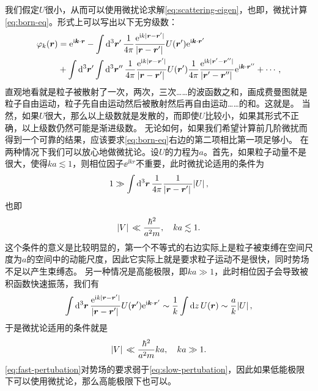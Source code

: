 我们假定$U$很小，从而可以使用微扰论求解\eqref{eq:scattering-eigen}，也即，微扰计算\eqref{eq:born-eq}。形式上可以写出以下无穷级数：
\[
    \begin{aligned}
        \varphi_k(\vb*{r}) &= \mathrm{e}^{\mathrm{i} \vb*{k} \cdot \vb*{r}} - \int \dd[3]{\vb*{r}'} \frac{1}{4\pi} \frac{\mathrm{e}^{\mathrm{i} k \abs*{\vb*{r} - \vb*{r}'}}}{\abs*{\vb*{r} - \vb*{r}'}} U(\vb*{r}') \mathrm{e}^{\mathrm{i} \vb*{k} \cdot \vb*{r}'} \\
        &+ \int \dd[3]{\vb*{r}'} \int \dd[3]{\vb*{r}''} \frac{1}{4\pi} \frac{\mathrm{e}^{\mathrm{i} k \abs*{\vb*{r} - \vb*{r}'}}}{\abs*{\vb*{r} - \vb*{r}'}} U(\vb*{r}') \frac{1}{4\pi} \frac{\mathrm{e}^{\mathrm{i} k \abs*{\vb*{r}' - \vb*{r}''}}}{\abs*{\vb*{r}' - \vb*{r}''}} \mathrm{e}^{\mathrm{i} \vb*{k} \cdot \vb*{r}''} + \cdots,
    \end{aligned}
\]
直观地看就是粒子被散射了一次，两次，三次……的波函数之和，画成费曼图就是粒子自由运动，粒子先自由运动然后被散射然后再自由运动……的和。这就是。
当然，如果$U$很大，那么以上级数就是发散的，而即使$U$比较小，如果其形式不正确，以上级数仍然可能是渐进级数。
无论如何，如果我们希望计算前几阶微扰而得到一个可靠的结果，应该要求\eqref{eq:born-eq}右边的第二项相比第一项足够小。
在两种情况下我们可以放心地做微扰论。设$U$的力程为$a$。首先，如果粒子动量不是很大，使得$k a \lesssim 1$，则相位因子$\ee^{\ii k r}$不重要，此时微扰论适用的条件为
\[
    1 \gg \int \dd[3]{\vb*{r}} \frac{1}{4\pi} \frac{1}{\abs*{\vb*{r} - \vb*{r}'}} \abs*{U},
\]
也即
\begin{equation}
    \abs*{V} \ll \frac{\hbar^2}{a^2 m} , \quad k a \lesssim 1.
    \label{eq:slow-pertubation}
\end{equation}
这个条件的意义是比较明显的，第一个不等式的右边实际上是粒子被束缚在空间尺度为$a$的空间中的动能尺度，因此它实际上就是要求粒子运动不是很快，同时势场不足以产生束缚态。
另一种情况是高能极限，即$ka \gg 1$，此时相位因子会导致被积函数快速振荡，我们有
\[
    \int \dd[3]{\vb*{r}} \frac{\mathrm{e}^{\mathrm{i} k \abs*{\vb*{r} - \vb*{r}'}}}{\abs*{\vb*{r} - \vb*{r}'}} U(\vb*{r}') \mathrm{e}^{\mathrm{i} \vb*{k} \cdot \vb*{r}'} \sim \frac{1}{k} \int \dd{z} U(\vb*{r}) \sim \frac{a}{k} \abs*{U},
\]
于是微扰论适用的条件就是
\begin{equation}
    \abs*{V} \ll \frac{\hbar^2}{a^2 m } ka , \quad k a \gg 1.
    \label{eq:fast-pertubation}
\end{equation}
\eqref{eq:fast-pertubation}对势场的要求弱于\eqref{eq:slow-pertubation}，因此如果低能极限下可以使用微扰论，那么高能极限下也可以。

